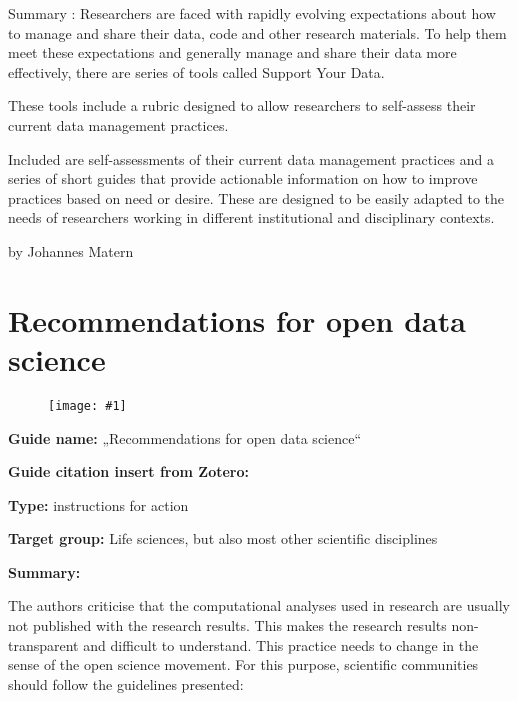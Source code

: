 \documentclass{article}
\newlength{\imgwidth}
\newcommand\scaledgraphics[2]{%
                
\settowidth{\imgwidth}{\texttt{[image: \#1]}}%
                
\setlength{\imgwidth}{\minof{\imgwidth}{#2\textwidth}}%
                
\texttt{[image: \#1]}%
                
}
\begin{document}
Summary : Researchers are faced with rapidly evolving expectations about how to manage and share their data, code and other research materials. To help them meet these expectations and generally manage and share their data more effectively, there are series of tools called Support Your Data.


These tools include a rubric designed to allow researchers to self-assess their current data management practices.


Included are self-assessments of their current data management practices and a series of short guides that provide actionable information on how to improve practices based on need or desire. These are designed to be easily adapted to the needs of researchers working in different institutional and disciplinary contexts.





by Johannes Matern





\section{ Recommendations for open data science}\label{H2986141}





\begin{figure}
\scaledgraphics{10e3bc75-5c14-48e3-a161-d685105f455b.png}{1}
\label{F57414871}
\end{figure}





\textbf{Guide name:} „Recommendations for open data science“


\textbf{Guide citation insert from Zotero:} \autocite{gymrek_recommendations_2016}


\textbf{Type:} instructions for action


\textbf{Target group:} Life sciences, but also most other scientific disciplines


\textbf{Summary: }


The authors criticise that the computational analyses used in research are usually not published with the research results. This makes the research results non-transparent and difficult to understand. This practice needs to change in the sense of the open science movement. For this purpose, scientific communities should follow the guidelines presented:
\end{document}
